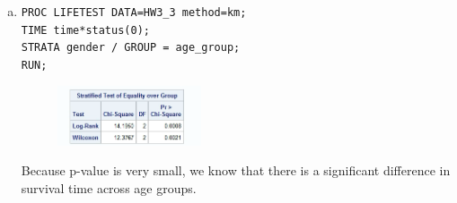 \documentclass[12pt]{elegantbook}
\begin{document}
\begin{solution}
\begin{enumerate}[(a)]
            \item \begin{verbatim}
PROC LIFETEST DATA=HW3_3 method=km;
TIME time*status(0);
STRATA gender / GROUP = age_group;
RUN;
            \end{verbatim}
            \begin{figure}[H]
                \centering
                \includegraphics[width=0.4\textwidth]{HW3_4b.png}
            \end{figure}
            Because p-value is very small, we know that there is a significant difference in survival time across age groups. 
        \end{enumerate}
    \end{solution}
\end{document}
